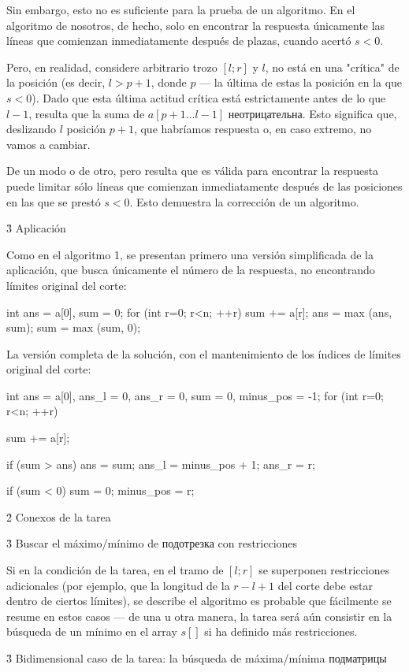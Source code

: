 Sin embargo, esto no es suficiente para la prueba de un algoritmo. En el algoritmo de nosotros, de hecho, solo en encontrar la respuesta únicamente las líneas que comienzan inmediatamente después de plazas, cuando acertó $s<0$.

Pero, en realidad, considere arbitrario trozo $[l;r]$ y $l$, no está en una "crítica" de la posición (es decir, $l > p+1$, donde $p$ --- la última de estas la posición en la que $s<0$). Dado que esta última actitud crítica está estrictamente antes de lo que $l-1$, resulta que la suma de $a[p+1 \ldots l-1]$ неотрицательна. Esto significa que, deslizando $l$ posición $p+1$, que habríamos respuesta o, en caso extremo, no vamos a cambiar.

De un modo o de otro, pero resulta que es válida para encontrar la respuesta puede limitar sólo líneas que comienzan inmediatamente después de las posiciones en las que se prestó $s<0$. Esto demuestra la corrección de un algoritmo.

\h3{ Aplicación }

Como en el algoritmo 1, se presentan primero una versión simplificada de la aplicación, que busca únicamente el número de la respuesta, no encontrando límites original del corte:

\code
int ans = a[0],
sum = 0;
for (int r=0; r<n; ++r) {
sum += a[r];
ans = max (ans, sum);
sum = max (sum, 0);
}
\endcode

La versión completa de la solución, con el mantenimiento de los índices de límites original del corte:

\code
int ans = a[0],
ans_l = 0,
ans_r = 0,
sum = 0,
minus_pos = -1;
for (int r=0; r<n; ++r) {
sum += a[r];

if (sum > ans) {
ans = sum;
ans_l = minus_pos + 1;
ans_r = r;
}

if (sum < 0) {
sum = 0;
minus_pos = r;
}
}
\endcode


\h2{ Conexos de la tarea }

\h3{ Buscar el máximo/mínimo de подотрезка con restricciones }

Si en la condición de la tarea, en el tramo de $[l;r]$ se superponen restricciones adicionales (por ejemplo, que la longitud de la $r-l+1$ del corte debe estar dentro de ciertos límites), se describe el algoritmo es probable que fácilmente se resume en estos casos --- de una u otra manera, la tarea será aún consistir en la búsqueda de un mínimo en el array $s[]$ si ha definido más restricciones.

\h3{ Bidimensional caso de la tarea: la búsqueda de máxima/mínima подматрицы }

